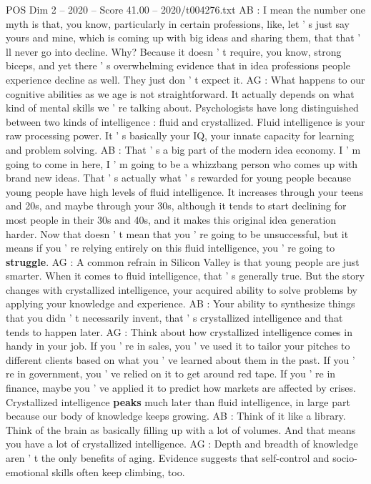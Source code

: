 \begin{textsample}{POS Dim 2 – 2020 – Score 41.00 – 2020/t004276.txt}
AB : I mean the number one myth is that, you know, particularly in certain professions, like, let ' s just say yours and mine, which is coming up with big ideas and sharing them, that that ' ll never go into decline.
Why?
Because it doesn ' t require, you know, strong biceps, and yet there ' s overwhelming evidence that in idea professions people experience decline as well.
They just don ' t expect it.
AG : What happens to our cognitive abilities as we age is not straightforward.
It actually depends on what kind of mental skills we ' re talking about.
Psychologists have long distinguished between two kinds of intelligence : fluid and crystallized.
Fluid intelligence is your raw processing power.
It ' s basically your IQ, your innate capacity for learning and problem solving.
AB : That ' s a big part of the modern idea economy.
I ' m going to come in here, I ' m going to be a whizzbang person who comes up with brand new ideas.
That ' s actually what ' s rewarded for young people because young people have high levels of fluid intelligence.
It increases through your teens and 20s, and maybe through your 30s, although it tends to start declining for most people in their 30s and 40s, and it makes this original idea generation harder.
Now that doesn ' t mean that you ' re going to be unsuccessful, but it means if you ' re relying entirely on this fluid intelligence, you ' re going to \textbf{struggle}.
AG : A common refrain in Silicon Valley is that young people are just smarter.
When it comes to fluid intelligence, that ' s generally true.
But the story changes with crystallized intelligence, your acquired ability to solve problems by applying your knowledge and experience.
AB : Your ability to synthesize things that you didn ' t necessarily invent, that ' s crystallized intelligence and that tends to happen later.
AG : Think about how crystallized intelligence comes in handy in your job.
If you ' re in sales, you ' ve used it to tailor your pitches to different clients based on what you ' ve learned about them in the past.
If you ' re in government, you ' ve relied on it to get around red tape.
If you ' re in finance, maybe you ' ve applied it to predict how markets are affected by crises.
Crystallized intelligence \textbf{peaks} much later than fluid intelligence, in large part because our body of knowledge keeps growing.
AB : Think of it like a library.
Think of the brain as basically filling up with a lot of volumes.
And that means you have a lot of crystallized intelligence.
AG : Depth and breadth of knowledge aren ' t the only benefits of aging.
Evidence suggests that self-control and socio-emotional skills often keep climbing, too.

\end{textsample}
